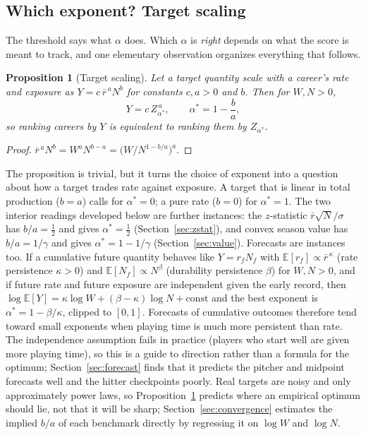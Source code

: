 \documentclass[11pt,letterpaper]{article}
\theoremstyle{plain}
\newtheorem{proposition}{Proposition}
\theoremstyle{definition}
\theoremstyle{remark}
\newcommand{\E}{\mathbb{E}}
\begin{document}
\subsection{Which exponent? Target scaling}
\label{sec:target}

The threshold says what $\alpha$ does. Which $\alpha$ is \emph{right} depends on what the score is meant to track, and one elementary observation organizes everything that follows.

\begin{proposition}[Target scaling]
\label{prop:target}
Let a target quantity scale with a career's rate and exposure as $Y = c\,\bar r^{\,a} N^{b}$ for constants $c, a > 0$ and $b$. Then for $W, N > 0$,
\begin{equation}
    Y = c\, Z_{\alpha^*}^{\,a}, \qquad \alpha^* = 1 - \frac{b}{a},
\end{equation}
so ranking careers by $Y$ is equivalent to ranking them by $Z_{\alpha^*}$.
\end{proposition}

\begin{proof}
$\bar r^{\,a} N^{b} = W^{a} N^{b-a} = \bigl(W/N^{1 - b/a}\bigr)^{a}$.
\end{proof}

The proposition is trivial, but it turns the choice of exponent into a question about how a target trades rate against exposure. A target that is linear in total production ($b = a$) calls for $\alpha^* = 0$; a pure rate ($b = 0$) for $\alpha^* = 1$. The two interior readings developed below are further instances: the $z$-statistic $\bar r\sqrt N/\sigma$ has $b/a = \tfrac12$ and gives $\alpha^* = \tfrac12$ (Section~\ref{sec:zstat}), and convex season value has $b/a = 1/\gamma$ and gives $\alpha^* = 1 - 1/\gamma$ (Section~\ref{sec:value}). Forecasts are instances too. If a cumulative future quantity behaves like $Y = r_f N_f$ with $\E[r_f] \propto \bar r^{\,\kappa}$ (rate persistence $\kappa > 0$) and $\E[N_f] \propto N^{\beta}$ (durability persistence $\beta$) for $W, N > 0$, and if future rate and future exposure are independent given the early record, then $\log \E[Y] = \kappa\log W + (\beta - \kappa)\log N + \text{const}$ and the best exponent is $\alpha^* = 1 - \beta/\kappa$, clipped to $[0,1]$. Forecasts of cumulative outcomes therefore tend toward small exponents when playing time is much more persistent than rate. The independence assumption fails in practice (players who start well are given more playing time), so this is a guide to direction rather than a formula for the optimum; Section~\ref{sec:forecast} finds that it predicts the pitcher and midpoint forecasts well and the hitter checkpoints poorly. Real targets are noisy and only approximately power laws, so Proposition~\ref{prop:target} predicts where an empirical optimum should lie, not that it will be sharp; Section~\ref{sec:convergence} estimates the implied $b/a$ of each benchmark directly by regressing it on $\log W$ and $\log N$.
\end{document}
